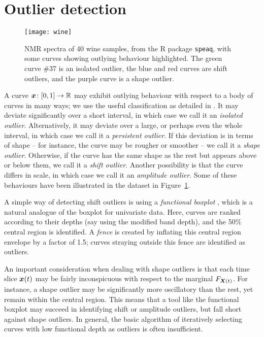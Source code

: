 \section{Outlier detection}
\label{sec:functional_outlier}

\begin{figure}
    \centering
    \texttt{[image: wine]}
    \caption{
        NMR spectra of 40 wine samples\protect\footnotemark, from the R
        package \texttt{speaq}, with some curves showing outlying behaviour
        highlighted.
        The green curve \#37 is an isolated outlier, the blue and red curves
        are shift outliers, and the purple curve is a shape outlier.
    }
    \label{fig:wine}
\end{figure}

A curve $\bm{x}\colon [0, 1] \to \mathbb{R}$ may exhibit outlying behaviour with respect
to a body of curves in many ways; we use the useful classification as detailed
in \textcite{hubert-rousseeuw-segeart-2015}.
It may deviate significantly over a short interval, in which case we call it
an \emph{isolated outlier}.
Alternatively, it may deviate over a large, or perhaps even the whole
interval, in which case we call it a \emph{persistent outlier}.
If this deviation is in terms of shape -- for instance, the curve may be
rougher or smoother -- we call it a \emph{shape outlier}.
Otherwise, if the curve has the same shape as the rest but appears above or
below them, we call it a \emph{shift outlier}.
Another possibility is that the curve differs in scale, in which case we call
it an \emph{amplitude outlier}.
Some of these behaviours have been illustrated in the dataset in
Figure~\ref{fig:wine}.

A simple way of detecting shift outliers is using a \emph{functional boxplot}
\parencite{sun-genton-2011}, which is a natural analogue of the boxplot for
univariate data.
Here, curves are ranked according to their depths (say using the modified band
depth), and the 50\% central region is identified.
A \emph{fence} is created by inflating this central region envelope by a
factor of 1.5; curves straying outside this fence are identified as outliers.

An important consideration when dealing with shape outliers is that each time
slice $\bm{x}(t)$ may be fairly inconspicuous with respect to the marginal
$F_{\bm{X}(t)}$.
For instance, a shape outlier may be significantly more oscillatory than the
rest, yet remain within the central region.
This means that a tool like the functional boxplot may succeed in identifying
shift or amplitude outliers, but fall short against shape outliers.
In general, the basic algorithm of iteratively selecting curves with low
functional depth as outliers is often insufficient.

